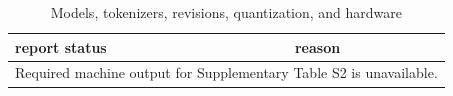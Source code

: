 \begin{table}[htbp]
\centering
\caption{Models, tokenizers, revisions, quantization, and hardware}
\label{tab:s2}
\begin{tabular}{ll}
\hline
report status & reason \\
\hline
\multicolumn{2}{l}{Required machine output for Supplementary Table S2 is unavailable.} \\
\hline
\end{tabular}
\end{table}
